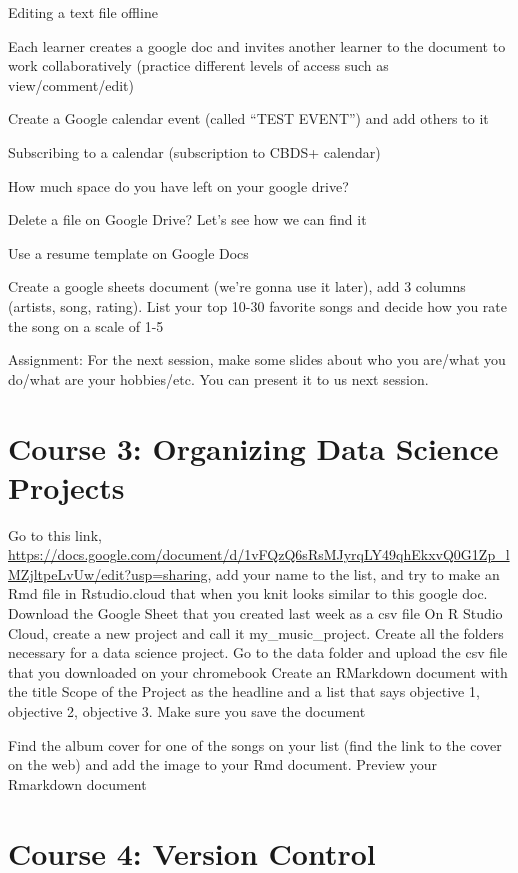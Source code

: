 \documentclass[]{book}
\begin{document}
Editing a text file offline

Each learner creates a google doc and invites another learner to the document to work collaboratively (practice different levels of access such as view/comment/edit)

Create a Google calendar event (called ``TEST EVENT'') and add others to it

Subscribing to a calendar (subscription to CBDS+ calendar)

How much space do you have left on your google drive?

Delete a file on Google Drive? Let's see how we can find it

Use a resume template on Google Docs

Create a google sheets document (we're gonna use it later), add 3 columns (artists, song, rating). List your top 10-30 favorite songs and decide how you rate the song on a scale of 1-5

Assignment: For the next session, make some slides about who you are/what you do/what are your hobbies/etc. You can present it to us next session.

\hypertarget{organizing}{%
\chapter*{Course 3: Organizing Data Science Projects}\label{organizing}}

Go to this link, \url{https://docs.google.com/document/d/1vFQzQ6sRsMJyrqLY49qhEkxvQ0G1Zp_lMZjltpeLvUw/edit?usp=sharing}, add your name to the list, and try to make an Rmd file in Rstudio.cloud that when you knit looks similar to this google doc.
Download the Google Sheet that you created last week as a csv file
On R Studio Cloud, create a new project and call it my\_music\_project.
Create all the folders necessary for a data science project.
Go to the data folder and upload the csv file that you downloaded on your chromebook
Create an RMarkdown document with the title Scope of the Project as the headline and a list that says objective 1, objective 2, objective 3. Make sure you save the document

Find the album cover for one of the songs on your list (find the link to the cover on the web) and add the image to your Rmd document. Preview your Rmarkdown document

\hypertarget{version-control}{%
\chapter*{Course 4: Version Control}\label{version-control}}
\end{document}
